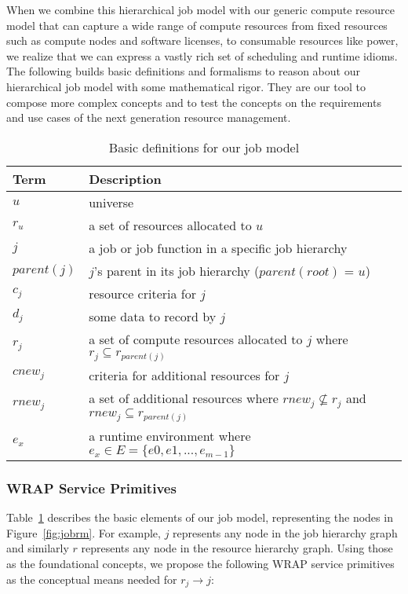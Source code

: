 When we combine this hierarchical job model with our generic
compute resource model that can capture a wide range
of compute resources from fixed resources such as compute nodes
and software licenses, to consumable resources like power,
we realize that we can express a vastly rich set
of scheduling and runtime idioms.
The following builds basic definitions and formalisms
to reason about our hierarchical job model with some mathematical rigor.
They are our tool to compose more complex concepts
and to test the concepts on the requirements and use cases
of the next generation resource management.

\begin{table}
\centering
\begin{tabular}{|l|l|}
\hline
Term & Description \\
\hline
$u$ & universe  \\
$r_u$ & a set of resources allocated to $u$ \\
$j$ & a job or job function in a specific job hierarchy \\
$parent(j)$ & $j$'s parent in its job hierarchy ($parent(root)$ = $u$) \\
$c_j$ & resource criteria for $j$ \\
$d_j$ & some data to record by $j$ \\
$r_j$ & a set of compute resources allocated to $j$ where $r_j \subseteq r_{parent(j)}$ \\
$cnew_j$ & criteria for additional resources for $j$ \\
$rnew_j$ & a set of additional resources where $rnew_j \not\subseteq r_j$ and $rnew_j \subseteq r_{parent(j)}$ \\
$e_x$ & a runtime environment where $e_x \in E = \{e0, e1, ..., e_{m-1}\}$ \\
\hline
\end{tabular}
\caption{Basic definitions for our job model}
\label{tab:def}
\end{table}

\subsubsection{WRAP Service Primitives}
\label{sect:prim}

Table~\ref{tab:def} describes the basic elements of our job model, representing
the nodes in Figure~\ref{fig:jobrm}. For example, $j$ represents any node
in the job hierarchy graph and similarly $r$ represents any node in the resource hierarchy graph.
Using those as the foundational concepts, we propose
the following WRAP service primitives as the conceptual means
needed for $r_j \rightarrow j$:

